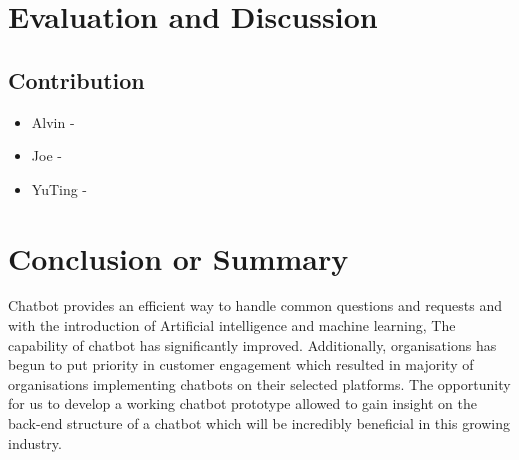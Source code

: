 \documentclass[11pt]{article}
\begin{document}
\section{Evaluation and Discussion}
\subsection{Contribution}
\begin{itemize}
	\item Alvin  -
	\item Joe    - 
	\item YuTing -
\end{itemize}

\section{Conclusion or Summary}
Chatbot provides an efficient way to handle common questions and requests and with the introduction of Artificial intelligence and machine learning, The capability of chatbot has significantly improved. Additionally, organisations has begun to put priority in customer engagement which resulted in majority of organisations implementing chatbots on their selected platforms. The opportunity for us to develop a working chatbot prototype allowed to gain insight on the back-end structure of a chatbot which will be incredibly beneficial in this growing industry.

\clearpage

%
 
\end{document}
